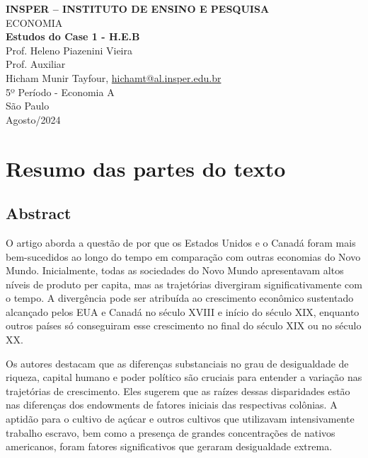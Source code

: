 \documentclass[a4paper,12pt]{article}[abntex2]
\begin{document}
\begin{titlepage}
    \centering
    \vspace*{1cm}
    \Large\textbf{INSPER – INSTITUTO DE ENSINO E PESQUISA}\\
    \Large ECONOMIA\\
    \vspace{1.5cm}
    \Large\textbf{Estudos do Case 1 - H.E.B}\\
    \vspace{1.5cm}
    Prof. Heleno Piazenini Vieira\\
    Prof. Auxiliar \\
    \vfill
    \normalsize
    Hicham Munir Tayfour, \href{mailto:hichamt@al.insper.edu.br}{hichamt@al.insper.edu.br}\\
    5º Período - Economia A\\
    \vfill
    São Paulo\\
    Agosto/2024
\end{titlepage}

\newpage
\tableofcontents
\thispagestyle{empty} %
\newpage
\setcounter{page}{1} %
\justify
\onehalfspacing

\pagestyle{fancy}
\fancyhf{}
\rhead{\thepage}

\section{\textbf{Resumo das partes do texto}}

\subsection*{\textbf{Abstract}}

O artigo aborda a questão de por que os Estados Unidos e o Canadá foram mais bem-sucedidos ao longo do tempo em comparação com outras economias do Novo Mundo. Inicialmente, todas as sociedades do Novo Mundo apresentavam altos níveis de produto per capita, mas as trajetórias divergiram significativamente com o tempo. A divergência pode ser atribuída ao crescimento econômico sustentado alcançado pelos EUA e Canadá no século XVIII e início do século XIX, enquanto outros países só conseguiram esse crescimento no final do século XIX ou no século XX.

Os autores destacam que as diferenças substanciais no grau de desigualdade de riqueza, capital humano e poder político são cruciais para entender a variação nas trajetórias de crescimento. Eles sugerem que as raízes dessas disparidades estão nas diferenças dos endowments de fatores iniciais das respectivas colônias. A aptidão para o cultivo de açúcar e outros cultivos que utilizavam intensivamente trabalho escravo, bem como a presença de grandes concentrações de nativos americanos, foram fatores significativos que geraram desigualdade extrema.
\end{document}
